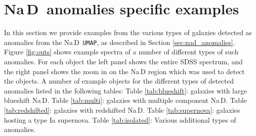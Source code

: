 \documentclass[fleqn,usenatbib]{mnras}
\def\nad{\mbox{Na\hspace{.5pt}{I}\,D}}
\begin{document}
{\begin{enumerate}
\end{enumerate}



\section{\nad\ anomalies specific examples}
\label{app:anomalies_tables}
In this section we provide examples from the various types of galaxies detected as anomalies from the \nad\ \texttt{UMAP}, as described in Section \ref{sec:nad_anomalies}. Figure \ref{fig:outs} shows example spectra of a number of different types of such anomalies.  For each object the left panel shows the entire SDSS spectrum, and the right panel shows the zoom in on the \nad{} region which was used to detect the objects. A number of example objects for the different types of detected anomalies listed in the following tables: Table \ref{tab:blueshift}: galaxies with large blueshift \nad{}. Table \ref{tab:multi}: galaxies with multiple component \nad{}. Table \ref{tab:redshifted}: galaxies with redshifted \nad{}. Table \ref{tab:supernova}: galaxies hosting a type Ia supernova. Table \ref{tab:isolated}: Various additional types of anomalies. 

\begin{figure}


\end{figure}}
\end{document}
